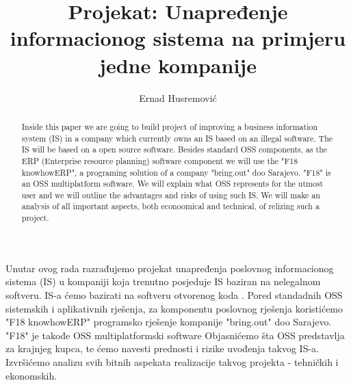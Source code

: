 \documentclass[times, utf8, seminar]{fit}
\begin{document}
\title{Projekat: Unapređenje informacionog sistema na primjeru jedne kompanije}

\author{Ernad Husremović}


\maketitle

\tableofcontents

\listoftables
\listoffigures

\begin{sazetak}

Unutar ovog rada razrađujemo projekat unapređenja poslovnog informacionog sistema (IS) u kompaniji koja trenutno posjeduje IS baziran na nelegalnom softveru. 
IS-a ćemo bazirati na softveru otvorenog koda .
Pored standadnih OSS sistemskih i aplikativnih rješenja, za komponentu poslovnog rješenja koristićemo "F18 knowhowERP" programsko rješenje kompanije "bring.out" doo Sarajevo. "F18" je takođe OSS multiplatformski software
Objasnićemo šta OSS predstavlja za krajnjeg kupca, te ćemo navesti prednosti i rizike uvođenja takvog IS-a.
Izvršićemo analizu svih bitnih aspekata realizacije takvog projekta - tehničkih i ekonomskih. 

\end{sazetak}

\begin{abstract}

Inside this paper we are going to build project of improving a business information system (IS) in a company which currently owns an IS based on an illegal software. The IS will be based on a open source software. Besides standard OSS components, as the ERP (Enterprise resource planning) software component we will use the  "F18 knowhowERP", a programing solution of a company "bring.out" doo Sarajevo. "F18" is an OSS multiplatform software. We will explain what OSS represents for the utmost user and we will outline the advantages and risks of using such IS. We will make an analysis of all important aspects, both econoomical and technical, of relizing such a project. 

\end{abstract}
\end{document}
